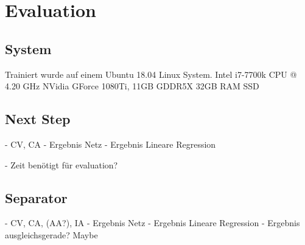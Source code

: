 \chapter{Evaluation}


\section{System}

Trainiert wurde auf einem Ubuntu 18.04 Linux System.
Intel i7-7700k CPU @ 4.20 GHz 
NVidia GForce 1080Ti, 11GB GDDR5X
32GB RAM
SSD 


\section{Next Step}

- CV, CA
- Ergebnis Netz
- Ergebnis Lineare Regression

- Zeit benötigt für evaluation?

\section{Separator}

- CV, CA, (AA?), IA
- Ergebnis Netz
- Ergebnis Lineare Regression
- Ergebnis ausgleichsgerade? Maybe